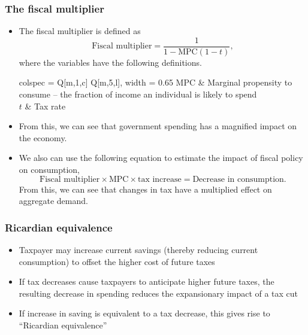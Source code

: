 \documentclass[../notes_compiled.tex]{subfiles}
\begin{document}
\subsubsection{The fiscal multiplier}
\begin{itemize}
\item The fiscal multiplier is defined as
\begin{equation}
\text{Fiscal multiplier} = \frac{1}{1-\text{MPC}(1-t)},
\end{equation}
where the variables have the following definitions.
\begin{table}[h!]
\centering
\begin{tblr}{colspec = {Q[m,1,c] Q[m,5,l]}, width = 0.65\textwidth}
MPC & Marginal propensity to consume -- the fraction of income an individual is likely to spend \\
$t$ & Tax rate
\end{tblr}
\end{table}

\item[] From this, we can see that government spending has a magnified impact on the economy. 

\item We also can use the following equation to estimate the impact of fiscal policy on consumption, 
\begin{equation}
\text{Fiscal multiplier} \times \text{MPC} \times \text{tax increase} = \text{Decrease in consumption}.
\end{equation}
From this, we can see that changes in tax have a multiplied effect on aggregate demand.
\end{itemize}

\subsubsection{Ricardian equivalence}
\begin{itemize}
\item Taxpayer may increase current savings (thereby reducing current consumption) to offset the higher cost of future taxes
\item If tax decreases cause taxpayers to anticipate higher future taxes, the resulting decrease in spending reduces the expansionary impact of a tax cut
\item If increase in saving is equivalent to a tax decrease, this gives rise to ``Ricardian equivalence''
\end{itemize}
\end{document}
